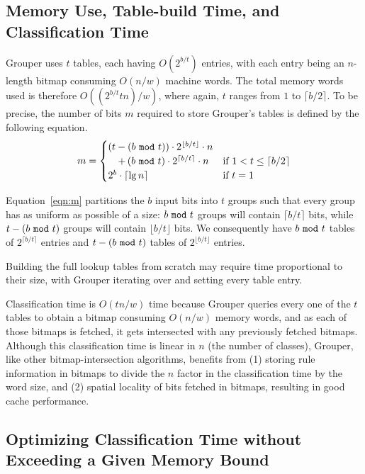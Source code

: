 \documentclass[10pt, conference, compsocconf]{IEEEtran}
\begin{document}
\subsection{Memory Use, Table-build Time, and Classification Time}
\label{sec:theory-analysis}

Grouper uses $t$ tables, each having $O(2^{b/t})$ entries, with each entry being
an $n$-length bitmap consuming $O(n/w)$ machine words.  The total memory words
used is therefore $O((2^{b/t}tn)/w)$, where again, $t$ ranges from $1$ to
$\lceil b/2\rceil$.  To be precise, the number of bits $m$ required to store
Grouper's tables is defined by the following equation.
\begin{equation}
\label{eqn:m} m = \begin{cases}
(t-(b\ {\tt mod}\ t))\cdot2^{\lfloor b/t\rfloor}\cdot n \\
\quad +\,(b\ {\tt mod}\ t)\cdot2^{\lceil b/t\rceil}\cdot n & \text{if $1<t\le \lceil b/2\rceil$}\\
2^b \cdot \lceil\lg n\rceil & \text{if $t=1$}
\end{cases}
\end{equation}

Equation~\ref{eqn:m} partitions the $b$ input bits into $t$ groups such that
every group has as uniform as possible of a size: $b\ {\tt mod}\ t$ groups will
contain $\lceil b/t\rceil$ bits, while $t-(b\ {\tt mod}\ t)$ groups will contain
$\lfloor b/t\rfloor$ bits.  We consequently have $b\ {\tt mod}\ t$ tables of
$2^{\lceil b/t\rceil}$ entries and $t-(b\ {\tt mod}\ t)$ tables of $2^{\lfloor
  b/t\rfloor}$ entries.

Building the full lookup tables from scratch may require time proportional to
their size, with Grouper iterating over and setting every table entry.

Classification time is $O(tn/w)$ time because Grouper queries every one of the
$t$ tables to obtain a bitmap consuming $O(n/w)$ memory words, and as each of
those bitmaps is fetched, it gets intersected with any previously fetched
bitmaps.  Although this classification time is linear in $n$ (the number of
classes), Grouper, like other bitmap-intersection algorithms, benefits from (1)
storing rule information in bitmaps to divide the $n$ factor in the
classification time by the word size, and (2) spatial locality of bits fetched
in bitmaps, resulting in good cache performance.

\subsection{Optimizing Classification Time without Exceeding a Given Memory Bound}
\label{sec:optimal-basic}
\end{document}
